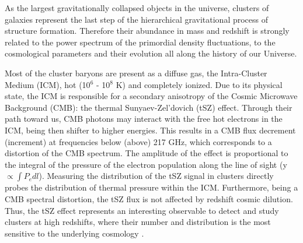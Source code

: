 \documentclass[11pt,a4paper,twoside,graphicx,color]{article}
\begin{document}
\vspace{-0.1cm} 
As the largest gravitationally collapsed objects in the universe, clusters of galaxies represent the last step of the hierarchical gravitational process of structure formation. Therefore their abundance in mass and redshift is strongly related to the power spectrum of the primordial density fluctuations, to the cosmological parameters and their evolution all along the history of our Universe. 

Most of the cluster baryons are present as a diffuse gas, the Intra-Cluster Medium (ICM), hot (10$^6$ - 10$^8$ K) and completely ionized. 
Due to its physical state, the ICM is responsible for a secondary anisotropy of the Cosmic Microwave Background (CMB): the thermal Sunyaev-Zel'dovich (tSZ) effect. Through their path toward us, CMB photons may interact with the free hot electrons in the ICM, being then shifter to higher energies. This results in a CMB flux decrement (increment) at frequencies below (above) 217 GHz, which corresponds to a distortion of the CMB spectrum. The amplitude of the effect is proportional to the integral of the pressure of the electron population along the line of sight (y~$\propto \int P_{e} dl$). Measuring the  distribution of the tSZ signal in clusters directly probes the distribution of thermal pressure within the ICM. Furthermore, being a CMB spectral distortion, the tSZ flux is not affected by redshift cosmic dilution. Thus, the tSZ effect represents an interesting observable to detect and study clusters at high redshifts, where their number and distribution is the most sensitive to the underlying cosmology \citep[e.g.][]{Carlstrom2002}.
\end{document}
